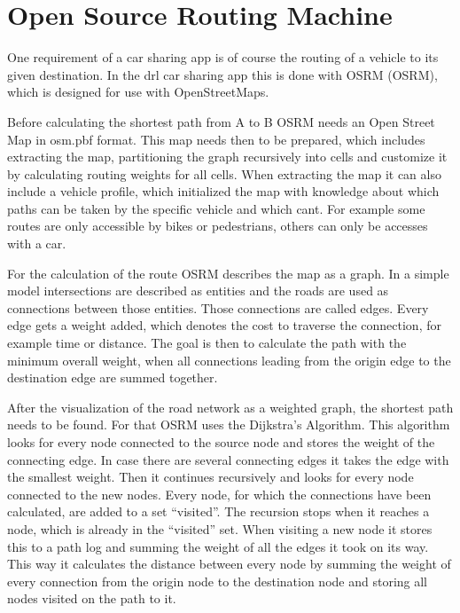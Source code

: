 \section{Open Source Routing Machine}

One requirement of a car sharing app is of course the routing of a vehicle to its given destination. In the drl car sharing app this is done with \acs{OSRM} (\acl{OSRM}), which is designed for use with OpenStreetMaps.

Before calculating the shortest path from A to B OSRM needs an Open Street Map in osm.pbf format. This map needs then to be prepared, which includes extracting the map, partitioning the graph recursively into cells and customize it by calculating routing weights for all cells. When extracting the map it can also include a vehicle profile, which initialized the map with knowledge about which paths can be taken by the specific vehicle and which cant. For example some routes are only accessible by bikes or pedestrians, others can only be accesses with a car.


For the calculation of the route OSRM describes the map as a graph. In a simple model intersections are described as entities and the roads are used as connections between those entities. Those connections are called edges. Every edge gets a weight added, which denotes the cost to traverse the connection, for example time or distance. The goal is then to calculate the path with the minimum overall weight, when all connections leading from the origin edge to the destination edge are summed together.


After the visualization of the road network as a weighted graph, the shortest path needs to be found. For that OSRM uses the Dijkstra's Algorithm. This algorithm looks for every node connected to the source node and stores the weight of the connecting edge. In case there are several connecting edges it takes the edge with the smallest weight. Then it continues recursively and looks for every node connected to the new nodes. Every node, for which the connections have been calculated, are added to a set ``visited''. The recursion stops when it reaches a node, which is already in the ``visited'' set. When visiting a new node it stores this to a path log and summing the weight of all the edges it took on its way. This way it calculates the distance between every node by summing the weight of every connection from the origin node to the destination node and storing all nodes visited on the path to it. 

